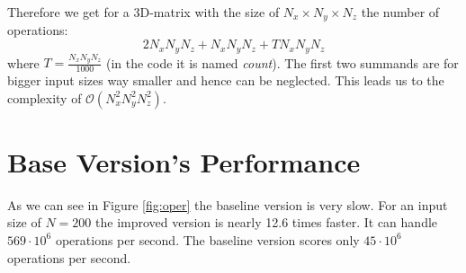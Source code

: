 \documentclass[12pt,a4paper]{article}
\begin{document}
Therefore we get for a 3D-matrix with the size of $ N_x\times N_y \times N_z $ the number of operations: \[ 2 N_x N_y N_z + N_x N_y N_z + T N_x N_y N_z \]
where $ T =  \frac{N_x N_y N_z}{1000}$ (in the code it is named \emph{count}).
The first two summands are for bigger input sizes way smaller and hence can be neglected. This leads us to the complexity of $ \mathcal{O}(N_x^2 N_y^2 N_z^2) $.

\section{Base Version's Performance}

As we can see in Figure \ref{fig:oper} the baseline version is very slow. For an input size of $N=200$ the improved version is nearly 12.6 times faster. It can handle $569\cdot10^6$ operations per second. The baseline version scores only $45\cdot10^6$ operations per second.
\end{document}
